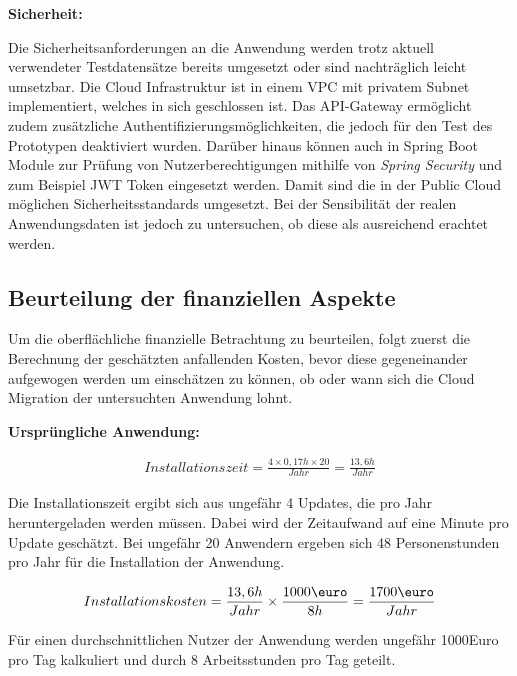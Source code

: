 \textbf{Sicherheit:}

Die Sicherheitsanforderungen an die Anwendung werden trotz aktuell verwendeter Testdatensätze bereits umgesetzt oder sind nachträglich leicht umsetzbar. Die Cloud Infrastruktur ist in einem \ac{VPC} mit privatem Subnet implementiert, welches in sich geschlossen ist. Das API-Gateway ermöglicht zudem zusätzliche Authentifizierungsmöglichkeiten, die jedoch für den Test des Prototypen deaktiviert wurden. Darüber hinaus können auch in \gls{Spring Boot} Module zur Prüfung von Nutzerberechtigungen mithilfe von \textit{Spring Security} und zum Beispiel JWT Token eingesetzt werden. Damit sind die in der Public Cloud möglichen Sicherheitsstandards umgesetzt. Bei der Sensibilität der realen Anwendungsdaten ist jedoch zu untersuchen, ob diese als ausreichend erachtet werden.

\subsection{Beurteilung der finanziellen Aspekte}
Um die oberflächliche finanzielle Betrachtung zu beurteilen, folgt zuerst die Berechnung der geschätzten anfallenden Kosten, bevor diese gegeneinander aufgewogen werden um einschätzen zu können, ob oder wann sich die Cloud Migration der untersuchten Anwendung lohnt.

\textbf{Ursprüngliche Anwendung:}

\begin{align}
    Installationszeit = \frac{4 \times 0,17h \times 20}{Jahr} = \frac{13,6h}{Jahr}
\end{align}

Die Installationszeit ergibt sich aus ungefähr 4 Updates, die pro Jahr heruntergeladen werden müssen. Dabei wird der Zeitaufwand auf eine Minute pro Update geschätzt. Bei ungefähr 20 Anwendern ergeben sich 48 Personenstunden pro Jahr für die Installation der Anwendung.

\begin{align}
    Installationskosten = \frac{13,6h}{Jahr} \times \frac{1000\mbox{\euro}}{8h} =\frac{1700\mbox{\euro}}{Jahr}
\end{align}

Für einen durchschnittlichen Nutzer der Anwendung werden ungefähr 1000Euro pro Tag kalkuliert und durch 8 Arbeitsstunden pro Tag geteilt. \pagebreak


